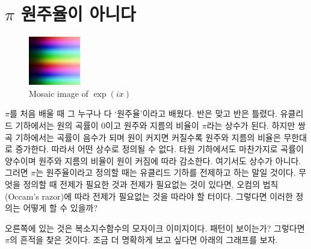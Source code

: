 \documentclass[10pt]{article}
\begin{document}
\section{$\pi$ 원주율이 아니다}
\begin{figure}
  \centering
  \includegraphics[width = 0.2\textwidth]{exp_mosaic.png}
  \caption{Mosaic image of $\exp\left(ix\right)$}
\end{figure}\par
$\pi$를 처음 배울 때 그 누구나 다 `원주율'이라고 배웠다. 반은 맞고 반은 틀렸다. 유클리드 기하에서는 원의 곡률이 0이고 원주와 지름의 비율이 $\pi$라는 상수가 된다. 하지만 쌍곡 기하에서는 곡률이 음수가 되며 원이 커지면 커질수록 원주와 지름의 비율은 무한대로 증가한다. 따라서 어떤 상수로 정의될 수 없다. 타원 기하에서도 마찬가지로 곡률이 양수이며 원주와 지름의 비율이 원이 커짐에 따라 감소한다. 여기서도 상수가 아니다. 그러면 $\pi$는 원주율이라고 정의할 때는 유클리드 기하를 전제하고 하는 말일 것이다. 무엇을 정의할 때 전제가 필요한 것과 전제가 필요없는 것이 있다면, 오컴의 법칙(Occam's razor)에 따라 전제가 필요없는 것을 따라야 할 터이다. 그렇다면 이러한 정의는 어떻게 할 수 있을까?\par
오른쪽에 있는 것은 복소지수함수의 모자이크 이미지이다. 패턴이 보이는가? 그렇다면 $\pi$의 흔적을 찾은 것이다. 조금 더 명확하게 보고 싶다면 아래의 그래프를 보자. 
\end{document}
